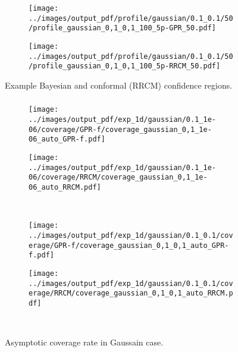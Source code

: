 \documentclass[t]{beamer}  %
\begin{document}
\begin{frame}[t]\frametitle{\insertsection}
  \begin{figure}%
    \centering
    \begin{subfigure}[b]{0.5\linewidth}
      \texttt{[image: ../images/output\_pdf/profile/gaussian/0.1\_0.1/50/profile\_gaussian\_0,1\_0,1\_100\_5p-GPR\_50.pdf]}
    \end{subfigure}%
    \begin{subfigure}[b]{0.5\linewidth}
      \texttt{[image: ../images/output\_pdf/profile/gaussian/0.1\_0.1/50/profile\_gaussian\_0,1\_0,1\_100\_5p-RRCM\_50.pdf]}
    \end{subfigure}
    \caption{Example Bayesian and conformal (RRCM) confidence regions.}
    \label{fig:gauss_1d_prof_gpr}
  \end{figure}
\end{frame}

\begin{frame}[t]\frametitle{\insertsection}
  \begin{figure}
    \centering
    \begin{subfigure}[b]{0.25\linewidth}
      \texttt{[image: ../images/output\_pdf/exp\_1d/gaussian/0.1\_1e-06/coverage/GPR-f/coverage\_gaussian\_0,1\_1e-06\_auto\_GPR-f.pdf]}
    \end{subfigure}%
    \begin{subfigure}[b]{0.25\linewidth}
      \texttt{[image: ../images/output\_pdf/exp\_1d/gaussian/0.1\_1e-06/coverage/RRCM/coverage\_gaussian\_0,1\_1e-06\_auto\_RRCM.pdf]}
    \end{subfigure}\\
    \begin{subfigure}[b]{0.25\linewidth}
      \texttt{[image: ../images/output\_pdf/exp\_1d/gaussian/0.1\_0.1/coverage/GPR-f/coverage\_gaussian\_0,1\_0,1\_auto\_GPR-f.pdf]}
    \end{subfigure}%
    \begin{subfigure}[b]{0.25\linewidth}
      \texttt{[image: ../images/output\_pdf/exp\_1d/gaussian/0.1\_0.1/coverage/RRCM/coverage\_gaussian\_0,1\_0,1\_auto\_RRCM.pdf]}
    \end{subfigure}\\
    \caption{Asymptotic coverage rate in Gaussain case.}
    \label{fig:gaussian_1d_high_noise}
  \end{figure}
\end{frame}
\end{document}
